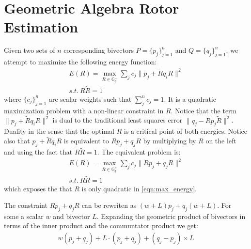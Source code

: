 \documentclass{birkjour}
\numberwithin{equation}{section}
\begin{document}
\section{Geometric Algebra Rotor Estimation}

Given two sets of $n$ corresponding bivectors $P = \{p_j\}_{j=1}^n$ and $Q = \{q_j\}_{j=1}^n$, we attempt to maximize the following energy function:
\begin{eqnarray}
	E(R) = \max_{R \in \mathbb{G}^{+}_3 } \sum_j { c_{j} \|p_j + \tilde R q_i R \|^2 }\\
	s.t. \ R \tilde R = 1 \nonumber
\end{eqnarray}
where $\{c_{j}\}_{j=1}^n$ are scalar weights such that $\sum_j^n{c_j} = 1$. It is a quadratic maximization problem with a non-linear constraint in $R$. Notice that the term $\|p_j + \tilde R q_i R\|^2$ is dual to the traditional least squares error $\|q_j - R p_j \tilde R\|^2$. Duality in the sense that the optimal $R$ is a critical point of both energies.
Notice also that $p_j + \tilde R q_i R$ is equivalent to $R p_j + q_j R$ by multiplying by $R$ on the left and using the fact that $R \tilde R = 1$. The equivalent problem is:
\begin{eqnarray}
	\label{eqn:max_energy}
	E(R) = \max_{R \in \mathbb{G}^{+}_3 } \sum_j { c_{j} \|R p_j + q_j R\|^2 }\\
	s.t. \ R \tilde R = 1 \nonumber
\end{eqnarray}
which exposes the that $R$ is only quadratic in \ref{eqn:max_energy}.

The constraint $R p_j + q_j R$ can be rewriten as $(w + L) p_j  + q_j (w + L)$. For some a scalar $w$ and bivector $L$. Expanding the geometric product of bivectors in terms of the inner product and the communtator product we get:
\begin{eqnarray}
	w  (p_j + q_j) + L \cdot (p_j + q_j)  + (q_j - p_j) \times L
\end{eqnarray}
\end{document}
